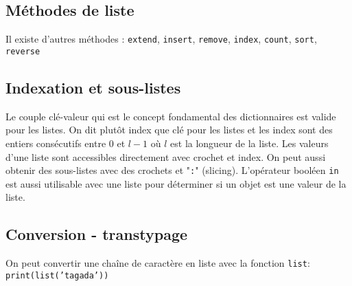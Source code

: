 \subsection{Méthodes de liste}
Il existe d'autres méthodes : \texttt{extend}, \texttt{insert}, \texttt{remove}, \texttt{index}, \texttt{count}, \texttt{sort}, \texttt{reverse}

\subsection{Indexation et sous-listes}
Le couple clé-valeur qui est le concept fondamental des dictionnaires est valide pour les listes. On dit plutôt index que clé pour les listes et les index sont des entiers consécutifs entre $0$ et $l-1$ où $l$ est la longueur de la liste. 
Les valeurs d'une liste sont accessibles directement avec crochet et index. On peut aussi obtenir des sous-listes avec des crochets et "\texttt{:}" (slicing).\newline
L'opérateur booléen \texttt{in} est aussi utilisable avec une liste pour déterminer si un objet est une valeur de la liste.

\subsection{Conversion - transtypage}
On peut convertir une chaîne de caractère en liste avec la fonction \texttt{list}:\newline
\texttt{print(list('tagada'))}


